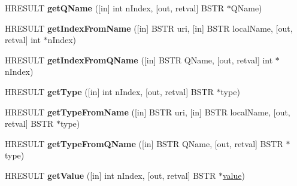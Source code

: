 \begin{DoxyCompactItemize}
H\+R\+E\+S\+U\+LT {\bfseries get\+Q\+Name} (\mbox{[}in\mbox{]} int n\+Index, \mbox{[}out, retval\mbox{]} B\+S\+TR $\ast$Q\+Name)
\item 
\mbox{\label{interface_m_s_x_m_l2_1_1_i_v_b_s_a_x_attributes_abcb7a54c72c73fd2cb65f8293b16796e}} 
H\+R\+E\+S\+U\+LT {\bfseries get\+Index\+From\+Name} (\mbox{[}in\mbox{]} B\+S\+TR uri, \mbox{[}in\mbox{]} B\+S\+TR local\+Name, \mbox{[}out, retval\mbox{]} int $\ast$n\+Index)
\item 
\mbox{\label{interface_m_s_x_m_l2_1_1_i_v_b_s_a_x_attributes_a5030eea26c73f90737afb63cd8a9d065}} 
H\+R\+E\+S\+U\+LT {\bfseries get\+Index\+From\+Q\+Name} (\mbox{[}in\mbox{]} B\+S\+TR Q\+Name, \mbox{[}out, retval\mbox{]} int $\ast$n\+Index)
\item 
\mbox{\label{interface_m_s_x_m_l2_1_1_i_v_b_s_a_x_attributes_a663ceda14498d9e8e26be3ebdd4a07dd}} 
H\+R\+E\+S\+U\+LT {\bfseries get\+Type} (\mbox{[}in\mbox{]} int n\+Index, \mbox{[}out, retval\mbox{]} B\+S\+TR $\ast$type)
\item 
\mbox{\label{interface_m_s_x_m_l2_1_1_i_v_b_s_a_x_attributes_a55b69be2554afee12c5fc0f046399478}} 
H\+R\+E\+S\+U\+LT {\bfseries get\+Type\+From\+Name} (\mbox{[}in\mbox{]} B\+S\+TR uri, \mbox{[}in\mbox{]} B\+S\+TR local\+Name, \mbox{[}out, retval\mbox{]} B\+S\+TR $\ast$type)
\item 
\mbox{\label{interface_m_s_x_m_l2_1_1_i_v_b_s_a_x_attributes_a3b90587d1748c98bc219044f2137ab3b}} 
H\+R\+E\+S\+U\+LT {\bfseries get\+Type\+From\+Q\+Name} (\mbox{[}in\mbox{]} B\+S\+TR Q\+Name, \mbox{[}out, retval\mbox{]} B\+S\+TR $\ast$type)
\item 
\mbox{\label{interface_m_s_x_m_l2_1_1_i_v_b_s_a_x_attributes_a8b181c19910c7782c0c7af280e0c53ad}} 
H\+R\+E\+S\+U\+LT {\bfseries get\+Value} (\mbox{[}in\mbox{]} int n\+Index, \mbox{[}out, retval\mbox{]} B\+S\+TR $\ast$\hyperlink{unionvalue}{value})
\item 
\mbox{\label{interface_m_s_x_m_l2_1_1_i_v_b_s_a_x_attributes_a55341240b3ee14099a30778c725892cc}} 

\end{DoxyCompactItemize}
